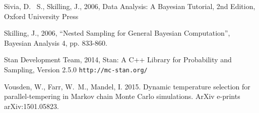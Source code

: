 \begin{thebibliography}{999}
 Sivia, 
D.~ S., Skilling, J., 2006, Data Analysis: A Bayesian Tutorial, 2nd 
Edition, Oxford University Press

 Skilling, 
J., 2006, ``Nested Sampling for General Bayesian Computation'', Bayesian 
Analysis 4, pp. 833-860.

 Stan Development Team, 2014,
Stan: A C++ Library for Probability and Sampling, Version 2.5.0
{\tt http://mc-stan.org/}

 Vousden, W., Farr, 
W.~M., Mandel, I. 2015. Dynamic temperature selection for 
parallel-tempering in Markov chain Monte Carlo simulations. ArXiv e-prints 
arXiv:1501.05823. 

\end{thebibliography}



%

